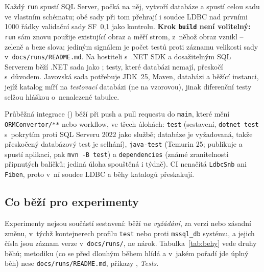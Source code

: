 \documentclass{article}
\begin{document}
Každý \texttt{run} spustí SQL Server, počká na něj, vytvoří databáze a spustí celou sadu ve vlastním schématu; obě sady při tom přehrají i soudce LDBC nad prvními 1000 řádky validační sady SF~0,1 jako kontrolu. \textbf{Krok \texttt{build} není volitelný:} \texttt{run} sám znovu použije existující obraz a měří strom, z~něhož obraz vznikl -- zeleně a beze slova; jediným signálem je počet testů proti záznamu velikosti sady v~\texttt{docs/runs/README.md}. Na hostiteli s~.NET SDK a dosažitelným SQL Serverem běží .NET sada jako ; testy, které databázi nemají, přeskočí s~důvodem. Javovská sada potřebuje JDK~25, Maven, databázi a běžící instanci, jejíž katalog míří na \emph{testovací} databázi (ne na vzorovou), jinak diferenční testy selžou hláškou o~nenalezené tabulce.

Průběžná integrace () běží při push a pull requestu do \texttt{main}, které mění \texttt{ORMConvertor/**} nebo workflow, ve třech úlohách: \texttt{test} (sestavení, \texttt{dotnet test} s~pokrytím proti SQL Serveru 2022 jako službě; databáze je vyžadovaná, takže přeskočený databázový test je selhání), \texttt{java-test} (Temurin 25; publikuje a spustí aplikaci, pak \texttt{mvn -B test}) a \texttt{dependencies} (známé zranitelnosti připnutých balíčků; jediná úloha spouštěná i týdně). CI nenačítá \texttt{LdbcSnb} ani \texttt{Fiben}, proto v~ní soudce LDBC a běhy katalogů přeskakují.

\subsection{Co běží pro experimenty}\label{sec:behy}

Experimenty nejsou součástí sestavení: běží \emph{na vyžádání}, za verzi nebo zásadní změnu, v~týchž kontejnerech profilu \texttt{test} nebo proti \texttt{mssql\_db} systému, a jejich čísla jsou záznam verze v~\texttt{docs/runs/}, ne nárok. Tabulka~\ref{tab:behy} vede druhy běhů; metodiku (co se před dlouhým během hlídá a v~jakém pořadí jde úplný běh) nese \texttt{docs/runs/README.md}, příkazy , \emph{Tests}.
\end{document}
